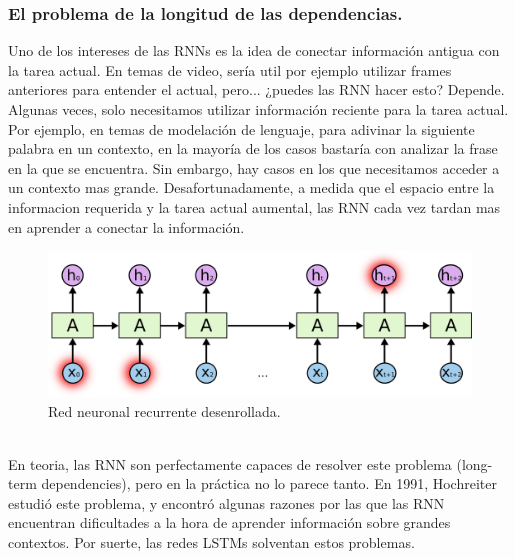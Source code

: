 \subsubsection{El problema de la longitud de las dependencias.}
Uno de los intereses de las RNNs es la idea de conectar información antigua con la tarea actual. En temas de video, sería util por ejemplo utilizar frames anteriores para entender el actual, pero... ¿puedes las RNN hacer esto? Depende.\\
Algunas veces, solo necesitamos utilizar información reciente para la tarea actual. Por ejemplo, en temas de modelación de lenguaje, para adivinar la siguiente palabra en un contexto, en la mayoría de los casos bastaría con analizar la frase en la que se encuentra. Sin embargo, hay casos en los que necesitamos acceder a un contexto mas grande. Desafortunadamente, a medida que el espacio entre la informacion requerida y la tarea actual aumental, las RNN cada vez tardan mas en aprender a conectar la información.\\
\begin{figure}[htp]
\centering
\includegraphics[scale=0.3]{images/RNN-longtermdependencies.png}
\caption{Red neuronal recurrente desenrollada.}
\end{figure}
\\En teoria, las RNN son perfectamente capaces de resolver este problema (long-term dependencies), pero en la práctica no lo parece tanto. En 1991, Hochreiter estudió este problema, y encontró algunas razones por las que las RNN encuentran dificultades a la hora de aprender información sobre grandes contextos. Por suerte, las redes LSTMs solventan estos problemas.
